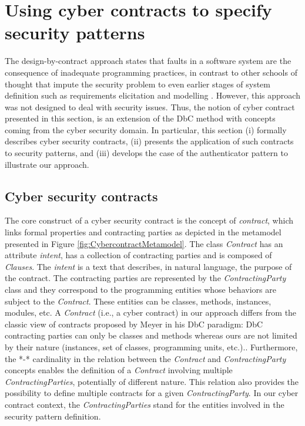 \section{Using cyber contracts to specify security patterns}

The design-by-contract approach \cite{meyer1992applying} states that faults in a software system are the consequence of inadequate programming practices, in contrast to other schools of thought that impute the security problem to even earlier stages of system definition such as requirements elicitation \cite{souag2018Amanda} \cite{mazo2020RSTemplate} \cite{mazo2016framework}and modelling \cite{sun2020domain}. However, this approach was not designed to deal with security issues. Thus, the notion of cyber contract presented in this section, is an extension of the DbC method with concepts coming from the cyber security domain.
In particular, this section (i) formally describes cyber security contracts, (ii) presents the application of such contracts to security patterns, and (iii) develops the case of the authenticator pattern to illustrate our approach.

\subsection{Cyber security contracts}
The core construct of a cyber security contract is the concept of \textit{contract}, which links formal properties and contracting parties as depicted in the  metamodel presented in Figure \ref{fig:CybercontractMetamodel}. The class \textit{Contract} has an attribute \textit{intent}, has a collection of contracting parties and is composed of \textit{Clauses}. The \textit{intent} is a text that describes, in natural language, the purpose of the contract. The contracting parties are represented by the \textit{ContractingParty} class and they correspond to the programming entities whose behaviors are subject to the \textit{Contract}. These entities can be classes, methods, instances, modules, etc. A \textit{Contract}  (i.e., a cyber contract) in our approach differs from the classic view of contracts proposed by Meyer in his DbC paradigm: DbC contracting parties can only be classes and methods whereas ours are not limited by their nature (instances, set of classes, programming units, etc.).. Furthermore, the *-* cardinality in the relation between the \textit{Contract} and \textit{ContractingParty} concepts enables the definition of a \textit{Contract} involving multiple \textit{ContractingParties}, potentially of different nature. This relation also provides the possibility to define multiple contracts for a given \textit{ContractingParty}. In our cyber contract context, the \textit{ContractingParties} stand for the entities involved in the security pattern definition. 

